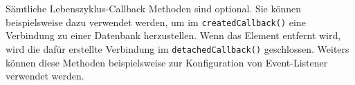Sämtliche Lebenszyklus-Callback Methoden sind optional. Sie können beispielsweise dazu verwendet werden, um im \lstinline|createdCallback()| eine Verbindung zu einer Datenbank herzustellen. Wenn das Element entfernt wird, wird die dafür erstellte Verbindung im \lstinline|detachedCallback()| geschlossen. Weiters können diese Methoden beispielsweise zur Konfiguration von Event-Listener verwendet werden.